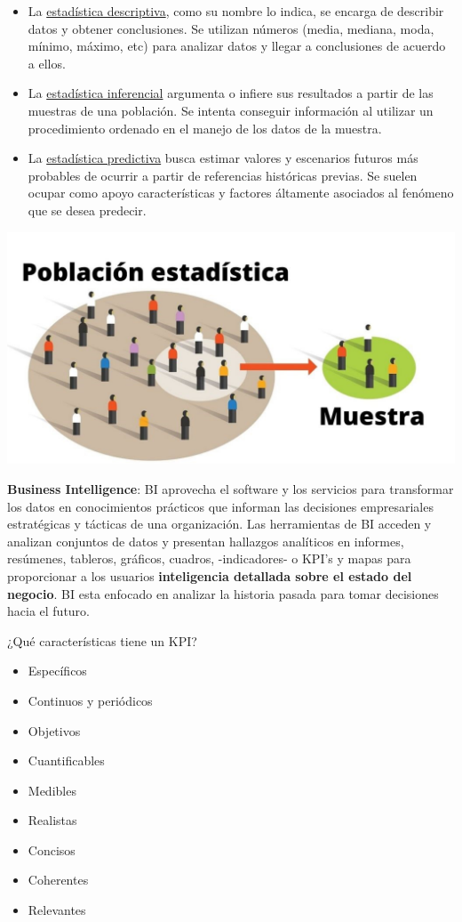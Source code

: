\documentclass[
]{book}
\providecommand{\tightlist}{%
  \setlength{\itemsep}{0pt}\setlength{\parskip}{0pt}}
\begin{document}
\begin{itemize}
\item
  La \href{}{estadística descriptiva}, como su nombre lo indica, se encarga de describir datos y obtener conclusiones. Se utilizan números (media, mediana, moda, mínimo, máximo, etc) para analizar datos y llegar a conclusiones de acuerdo a ellos.
\item
  La \href{}{estadística inferencial} argumenta o infiere sus resultados a partir de las muestras de una población. Se intenta conseguir información al utilizar un procedimiento ordenado en el manejo de los datos de la muestra.
\item
  La \href{}{estadística predictiva} busca estimar valores y escenarios futuros más probables de ocurrir a partir de referencias históricas previas. Se suelen ocupar como apoyo características y factores áltamente asociados al fenómeno que se desea predecir.
\end{itemize}

\begin{center}\includegraphics{img/01-intro2ds/02_muestra} \end{center}

\textbf{Business Intelligence}: BI aprovecha el software y los servicios para transformar los datos en conocimientos prácticos que informan las decisiones empresariales estratégicas y tácticas de una organización. Las herramientas de BI acceden y analizan conjuntos de datos y presentan hallazgos analíticos en informes, resúmenes, tableros, gráficos, cuadros, -indicadores- o KPI's y mapas para proporcionar a los usuarios \textbf{inteligencia detallada sobre el estado del negocio}. BI esta enfocado en analizar la historia pasada para tomar decisiones hacia el futuro.

¿Qué características tiene un KPI?

\begin{itemize}
\tightlist
\item
  Específicos
\item
  Continuos y periódicos
\item
  Objetivos
\item
  Cuantificables
\item
  Medibles
\item
  Realistas
\item
  Concisos
\item
  Coherentes
\item
  Relevantes
\end{itemize}
\end{document}
